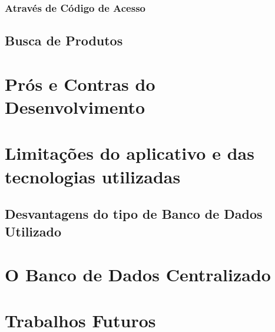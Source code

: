 \subsubsection{Através de Código de Acesso}

\subsection{Busca de Produtos}


\section{Prós e Contras do Desenvolvimento}


\section{Limitações do aplicativo e das tecnologias utilizadas}
\subsection{Desvantagens do tipo de Banco de Dados Utilizado}

\section{O Banco de Dados Centralizado}

\section{Trabalhos Futuros}


